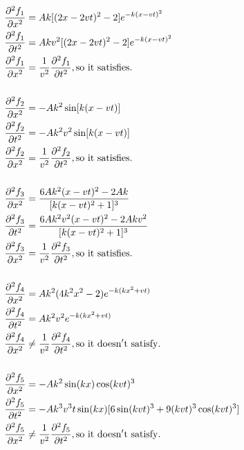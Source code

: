 \documentclass{article}
\begin{document}
\section{}
\begin{align*}
\frac{\partial^2f_1}{\partial x^2}&=
Ak[(2x-2vt)^2-2]e^{-k(x-vt)^2}\\
\frac{\partial^2f_1}{\partial t^2}&=
Akv^2[(2x-2vt)^2-2]e^{-k(x-vt)^2}\\
\frac{\partial^2f_1}{\partial x^2}&=
\frac{1}{v^2}\frac{\partial^2f_1}{\partial t^2},
{\rm so\ it\ satisfies.}\\
\\
\frac{\partial^2f_2}{\partial x^2}&=
-Ak^2\sin[k(x-vt)]\\
\frac{\partial^2f_2}{\partial t^2}&=
-Ak^2v^2\sin[k(x-vt)]\\
\frac{\partial^2f_2}{\partial x^2}&=
\frac{1}{v^2}\frac{\partial^2f_2}{\partial t^2},
{\rm so\ it\ satisfies.}\\
\\
\frac{\partial^2f_3}{\partial x^2}&=
\frac{6Ak^2(x-vt)^2-2Ak}{[k(x-vt)^2+1]^3}\\
\frac{\partial^2f_3}{\partial t^2}&=
\frac{6Ak^2v^2(x-vt)^2-2Akv^2}{[k(x-vt)^2+1]^3}\\
\frac{\partial^2f_3}{\partial x^2}&=
\frac{1}{v^2}\frac{\partial^2f_3}{\partial t^2},
{\rm so\ it\ satisfies.}\\
\\
\frac{\partial^2f_4}{\partial x^2}&=
Ak^2(4k^2x^2-2)e^{-k(kx^2+vt)}\\
\frac{\partial^2f_4}{\partial t^2}&=
Ak^2v^2e^{-k(kx^2+vt)}\\
\frac{\partial^2f_4}{\partial x^2}&\neq
\frac{1}{v^2}\frac{\partial^2f_4}{\partial t^2},
{\rm so\ it\ doesn't\ satisfy.}\\
\\
\frac{\partial^2f_5}{\partial x^2}&=
-Ak^2\sin(kx)\cos(kvt)^3\\
\frac{\partial^2f_5}{\partial t^2}&=
-Ak^3v^3t\sin(kx)[6\sin(kvt)^3+9(kvt)^3\cos(kvt)^3]\\
\frac{\partial^2f_5}{\partial x^2}&\neq
\frac{1}{v^2}\frac{\partial^2f_5}{\partial t^2},
{\rm so\ it\ doesn't\ satisfy.}\\
\end{align*}
\end{document}
